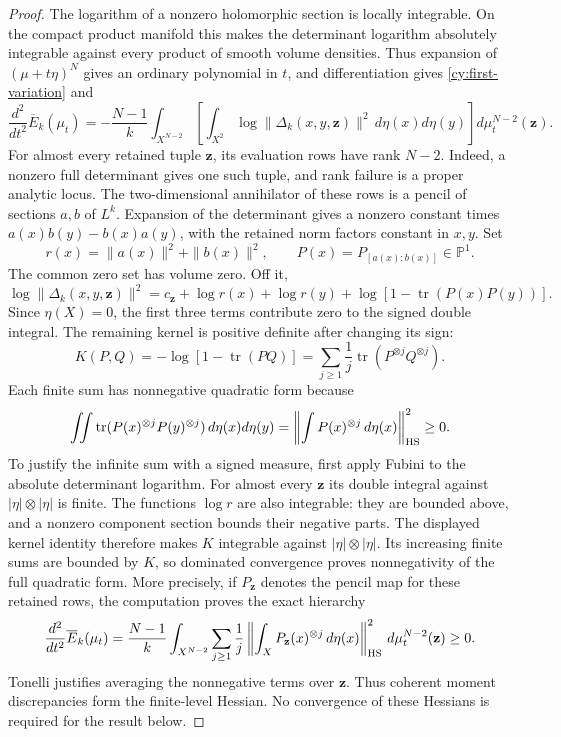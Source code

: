 \begin{proof}
The logarithm of a nonzero holomorphic section is locally integrable.
On the compact product manifold this makes the determinant logarithm
absolutely integrable against every product of smooth volume densities.
Thus expansion of $(\mu+t\eta)^N$ gives an ordinary polynomial in
$t$, and differentiation gives \eqref{cy:first-variation} and
\[
 \frac{d^2}{dt^2}\overline E_k(\mu_t)
 =-\frac{N-1}{k}\int_{X^{N-2}}
   \left[\int_{X^2}\log\|\Delta_k(x,y,\mathbf z)\|^2
                      \,d\eta(x)d\eta(y)\right]d\mu_t^{N-2}(\mathbf z).
\]
For almost every retained tuple $\mathbf z$, its evaluation rows have
rank $N-2$. Indeed, a nonzero full determinant gives one such tuple,
and rank failure is a proper analytic locus. The two-dimensional
annihilator of these rows is a pencil of sections $a,b$ of $L^k$.
Expansion of the determinant gives a nonzero constant times
$a(x)b(y)-b(x)a(y)$, with the retained norm factors constant in $x,y$.
Set
\[
 r(x)=\|a(x)\|^2+\|b(x)\|^2,\qquad
 P(x)=P_{[a(x):b(x)]}\in\mathbb P^1.
\]
The common zero set has volume zero. Off it,
\[
 \log\|\Delta_k(x,y,\mathbf z)\|^2
 =c_{\mathbf z}+\log r(x)+\log r(y)
                     +\log[1-\operatorname{tr}(P(x)P(y))].
\]
Since $\eta(X)=0$, the first three terms contribute zero to the signed
double integral. The remaining kernel is positive definite after
changing its sign:
\begin{equation}
 K(P,Q)=-\log[1-\operatorname{tr}(PQ)]
   =\sum_{j\ge1}\frac1j
            \operatorname{tr}(P^{\otimes j}Q^{\otimes j}).
 \label{cy:projective-kernel}
\end{equation}
Each finite sum has nonnegative quadratic form because
\[
 \iint\operatorname{tr}(P(x)^{\otimes j}P(y)^{\otimes j})
                         \,d\eta(x)d\eta(y)
 =\left\|\int P(x)^{\otimes j}\,d\eta(x)\right\|_{\rm HS}^2\ge0.
\]
To justify the infinite sum with a signed measure, first apply Fubini
to the absolute determinant logarithm. For almost every $\mathbf z$
its double integral against $|\eta|\otimes|\eta|$ is finite. The
functions $\log r$ are also integrable: they are bounded above, and a
nonzero component section bounds their negative parts. The displayed
kernel identity therefore makes $K$ integrable against
$|\eta|\otimes|\eta|$. Its increasing finite sums are bounded by $K$,
so dominated convergence proves nonnegativity of the full quadratic
form. More precisely, if $P_{\mathbf z}$ denotes the pencil map for
these retained rows, the computation proves the exact hierarchy
\begin{equation}
 \frac{d^2}{dt^2}\overline E_k(\mu_t)
 =\frac{N-1}{k}\int_{X^{N-2}}
   \sum_{j\ge1}\frac1j
   \left\|\int_X P_{\mathbf z}(x)^{\otimes j}\,d\eta(x)
          \right\|_{\rm HS}^2
                  \,d\mu_t^{N-2}(\mathbf z)\ge0.
 \label{cy:hessian-hierarchy}
\end{equation}
Tonelli justifies averaging the nonnegative terms over $\mathbf z$.
Thus coherent moment discrepancies form the finite-level Hessian.
No convergence of these Hessians is required for the result below.
\end{proof}

